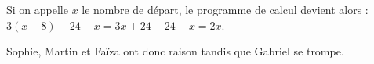 
\medskip

Si on appelle $x$ le nombre de départ, le programme de calcul devient alors :\\
$3(x+8)-24-x=3x+24-24-x=2x$.

Sophie, Martin et Faïza ont donc raison tandis que Gabriel se trompe.

\medskip

